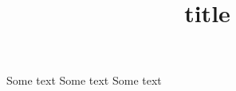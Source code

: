 \documentclass{article}
\title{title}
\begin{document}
{
\pagecolor{cyan}
Some text
\newpage
Some text
}
\newpage
Some text
\end{document}
